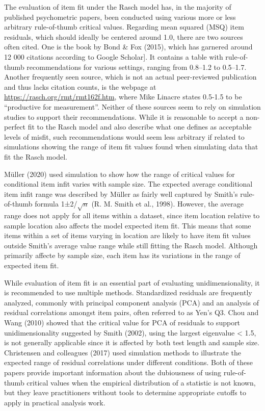 \documentclass[
  letterpaper,
  DIV=11,
  numbers=noendperiod]{scrartcl}
\begin{document}
The evaluation of item fit under the Rasch model has, in the majority of
published psychometric papers, been conducted using various more or less
arbitrary rule-of-thumb critical values. Regarding mean squared (MSQ)
item residuals, which should ideally be centered around 1.0, there are
two sources often cited. One is the book by Bond \& Fox (2015), which
has garnered around 12 000 citations according to Google Scholar{]}. It
contains a table with rule-of-thumb recommendations for various
settings, ranging from 0.8--1.2 to 0.5--1.7. Another frequently seen
source, which is not an actual peer-reviewed publication and thus lacks
citation counts, is the webpage at
\url{https://rasch.org/rmt/rmt162f.htm}, where Mike Linacre states
0.5-1.5 to be ``productive for measurement''. Neither of these sources
seem to rely on simulation studies to support their recommendations.
While it is reasonable to accept a non-perfect fit to the Rasch model
and also describe what one defines as acceptable levels of misfit, such
recommendations would seem less arbitrary if related to simulations
showing the range of item fit values found when simulating data that fit
the Rasch model.

Müller (2020) used simulation to show how the range of critical values
for conditional item infit varies with sample size. The expected average
conditional item infit range was described by Müller as fairly well
captured by Smith's rule-of-thumb formula 1±2/\(\sqrt{n}\) (R. M. Smith
et al., 1998). However, the average range does not apply for all items
within a dataset, since item location relative to sample location also
affects the model expected item fit. This means that some items within a
set of items varying in location are likely to have item fit values
outside Smith's average value range while still fitting the Rasch model.
Although primarily affecte by sample size, each item has its variations
in the range of expected item fit.

While evaluation of item fit is an essential part of evaluating
unidimensionality, it is recommended to use multiple methods.
Standardized residuals are frequently analyzed, commonly with principal
component analysis (PCA) and an analysis of residual correlations
amongst item pairs, often referred to as Yen's Q3. Chou and Wang (2010)
showed that the critical value for PCA of residuals to support
unidimensionality suggested by Smith (2002), using the largest
eigenvalue \textless{} 1.5, is not generally applicable since it is
affected by both test length and sample size. Christensen and colleagues
(2017) used simulation methods to illustrate the expected range of
residual correlations under different conditions. Both of these papers
provide important information about the dubiousness of using
rule-of-thumb critical values when the empirical distribution of a
statistic is not known, but they leave practitioners without tools to
determine appropriate cutoffs to apply in practical analysis work.
\end{document}
